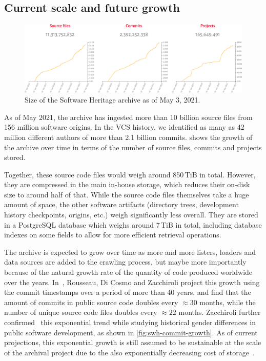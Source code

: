 \subsection{Current scale and future growth}

\begin{figure}
    \centering
    \includegraphics[width=0.9\linewidth]{img/swh-size}
    \caption{Size of the Software Heritage archive as of May 3, 2021.}%
    \label{fig:swh-size}
\end{figure}

As of May 2021, the archive has ingested more than 10 billion source files from
156 million software origins. In the \gls{VCS} history, we identified as many
as 42 million different authors of more than 2.1 billion commits.
 shows the growth of the archive over time in terms of the
number of source files, commits and projects stored.

Together, these source code files would weigh around 850\,TiB in total.
However, they are compressed in the main in-house storage, which reduces their
on-disk size to around half of that. While the
source code files themselves take a huge amount of space, the other software
artifacts (directory trees, development history checkpoints, origins, etc.)
weigh significantly less overall. They are stored in a PostgreSQL database
which weighs around 7\,TiB in total, including database indexes on some fields
to allow for more efficient retrieval operations.

The archive is expected to grow over time as more and more listers,
loaders and data sources are added to the crawling process, but maybe more
importantly because of the natural growth rate of the quantity of code produced
worldwide over the years. In~\cite{swh-provenance-emse}, Rousseau, Di Cosmo and
Zacchiroli project this growth using the commit timestamps over a period of
more than 40 years, and find that the amount of commits in public source code
doubles every $\approx 30$ months, while the number of unique source code files
doubles every $\approx 22$ months. Zacchiroli further
confirmed~\cite{ieee-sw-gender-swh} this exponential trend while studying
historical gender differences in public software development, as shown in
\cref{fig:swh-commit-growth}. As of current projections, this exponential
growth is still assumed to be sustainable at the scale of the archival project
due to the also exponentially decreasing cost of
storage~\cite{swh-provenance-emse}.

